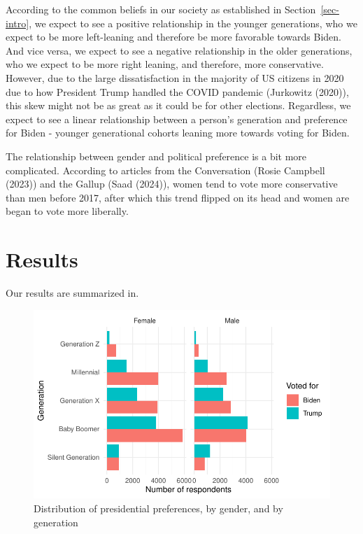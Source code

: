 \documentclass[
  letterpaper,
  DIV=11,
  numbers=noendperiod]{scrartcl}
\begin{document}
According to the common beliefs in our society as established in
Section~\ref{sec-intro}, we expect to see a positive relationship in the
younger generations, who we expect to be more left-leaning and therefore
be more favorable towards Biden. And vice versa, we expect to see a
negative relationship in the older generations, who we expect to be more
right leaning, and therefore, more conservative. However, due to the
large dissatisfaction in the majority of US citizens in 2020 due to how
President Trump handled the COVID pandemic (Jurkowitz (2020)), this skew
might not be as great as it could be for other elections. Regardless, we
expect to see a linear relationship between a person's generation and
preference for Biden - younger generational cohorts leaning more towards
voting for Biden.

The relationship between gender and political preference is a bit more
complicated. According to articles from the Conversation (Rosie Campbell
(2023)) and the Gallup (Saad (2024)), women tend to vote more
conservative than men before 2017, after which this trend flipped on its
head and women are began to vote more liberally.

\hypertarget{sec-results}{%
\section{Results}\label{sec-results}}

Our results are summarized in.

\begin{figure}

{\centering \includegraphics{paper_files/figure-pdf/fig-pres-pref-gender-generation-1.pdf}

}

\caption{\label{fig-pres-pref-gender-generation}Distribution of
presidential preferences, by gender, and by generation}

\end{figure}
\end{document}
